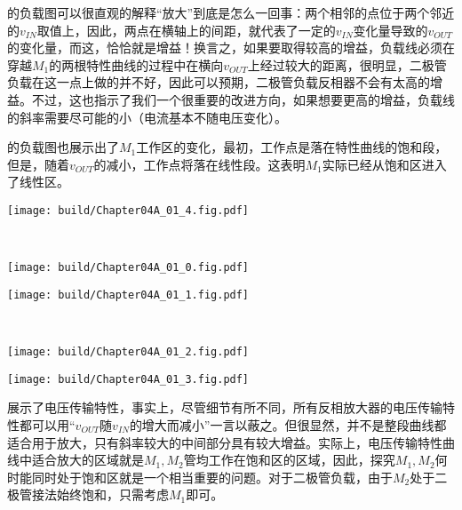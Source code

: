的负载图可以很直观的解释“放大”到底是怎么一回事：两个相邻的点位于两个邻近的$v_{IN}$取值上，因此，两点在横轴上的间距，就代表了一定的$v_{IN}$变化量导致的$v_{OUT}$的变化量，而这，恰恰就是增益！换言之，如果要取得较高的增益，负载线必须在穿越$M_1$的两根特性曲线的过程中在横向$v_{OUT}$上经过较大的距离，很明显，二极管负载在这一点上做的并不好，因此可以预期，二极管负载反相器不会有太高的增益。不过，这也指示了我们一个很重要的改进方向，如果想要更高的增益，负载线的斜率需要尽可能的小（电流基本不随电压变化）。

的负载图也展示出了$M_1$工作区的变化，最初，工作点是落在特性曲线的饱和段，但是，随着$v_{OUT}$的减小，工作点将落在线性段。这表明$M_1$实际已经从饱和区进入了线性区。

\begin{Figure}[二极管负载反相放大器的大信号特性]
    \begin{FigureSub}
        \texttt{[image: build/Chapter04A\_01\_4.fig.pdf]}
    \end{FigureSub}\\ \vspace{0.25cm}
    \begin{FigureSub}
        \texttt{[image: build/Chapter04A\_01\_0.fig.pdf]}
    \end{FigureSub}
    \begin{FigureSub}
        \texttt{[image: build/Chapter04A\_01\_1.fig.pdf]}
    \end{FigureSub}\\ \vspace{0.25cm}
    \begin{FigureSub}
        \texttt{[image: build/Chapter04A\_01\_2.fig.pdf]}
    \end{FigureSub}
    \begin{FigureSub}
        \texttt{[image: build/Chapter04A\_01\_3.fig.pdf]}
    \end{FigureSub}
\end{Figure}

展示了电压传输特性，事实上，尽管细节有所不同，所有反相放大器的电压传输特性都可以用“$v_{OUT}$随$v_{IN}$的增大而减小”一言以蔽之。但很显然，并不是整段曲线都适合用于放大，只有斜率较大的中间部分具有较大增益。实际上，电压传输特性曲线中适合放大的区域就是$M_1,M_2$管均工作在饱和区的区域，因此，探究$M_1,M_2$何时能同时处于饱和区就是一个相当重要的问题。对于二极管负载，由于$M_2$处于二极管接法始终饱和，只需考虑$M_1$即可。

